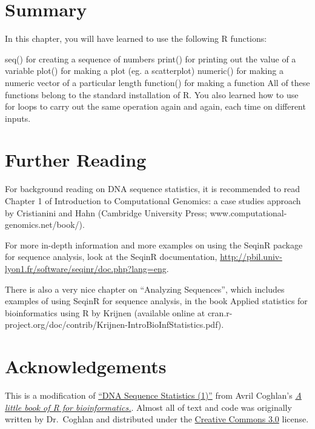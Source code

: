 \documentclass[
]{book}
\begin{document}
\hypertarget{summary-2}{%
\section{Summary}\label{summary-2}}

In this chapter, you will have learned to use the following R functions:

seq() for creating a sequence of numbers
print() for printing out the value of a variable
plot() for making a plot (eg. a scatterplot)
numeric() for making a numeric vector of a particular length
function() for making a function
All of these functions belong to the standard installation of R. You also learned how to use for loops to carry out the same operation again and again, each time on different inputs.

\hypertarget{further-reading}{%
\section{Further Reading}\label{further-reading}}

For background reading on DNA sequence statistics, it is recommended to read Chapter 1 of Introduction to Computational Genomics: a case studies approach by Cristianini and Hahn (Cambridge University Press; www.computational-genomics.net/book/).

For more in-depth information and more examples on using the SeqinR package for sequence analysis, look at the SeqinR documentation, \url{http://pbil.univ-lyon1.fr/software/seqinr/doc.php?lang=eng}.

There is also a very nice chapter on ``Analyzing Sequences'', which includes examples of using SeqinR for sequence analysis, in the book Applied statistics for bioinformatics using R by Krijnen (available online at cran.r-project.org/doc/contrib/Krijnen-IntroBioInfStatistics.pdf).

\hypertarget{acknowledgements-2}{%
\section{Acknowledgements}\label{acknowledgements-2}}

This is a modification of \href{https://a-little-book-of-r-for-bioinformatics.readthedocs.io/en/latest/src/chapter1.html}{``DNA Sequence Statistics (1)''} from Avril Coghlan's \href{https://a-little-book-of-r-for-bioinformatics.readthedocs.io/en/latest/index.html}{\emph{A little book of R for bioinformatics.}}. Almost all of text and code was originally written by Dr.~Coghlan and distributed under the \href{https://creativecommons.org/licenses/by/3.0/us/}{Creative Commons 3.0} license.
\end{document}
